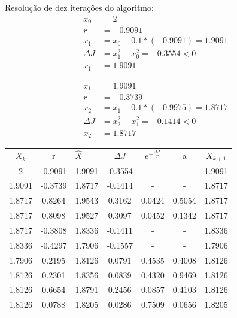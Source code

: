 \documentclass[12pt]{article}
\newenvironment{exercise}[2][Exercício]{\begin{trivlist}
\item[\hskip \labelsep {\bfseries #1}\hskip \labelsep {\bfseries #2.}]}{\end{trivlist}}
\begin{document}
\begin{exercise}{3.b}
Resolução de dez iterações do algoritmo:
\begin{align}
x_0 &= 2 \\
\nonumber r &= -0.9091 \\
\nonumber x_1 &= x_0 + 0.1*(-0.9091) = 1.9091 \\
\nonumber \Delta J &= x_1^2 - x_0^2 = -0.3554 < 0 \\ 
\nonumber x_1 &= 1.9091
\end{align}

\begin{align}
x_1 &= 1.9091 \\
\nonumber r &= -0.3739 \\
\nonumber x_2 &= x_1 + 0.1*(-0.9975) = 1.8717 \\
\nonumber \Delta J &= x_2^2 - x_1^2 = -0.1414 < 0 \\ 
\nonumber x_2 &= 1.8717
\end{align}

\begin{table}[H]
\centering
\label{t01}
\begin{tabular}{ccccccc}
$X_k$  & r       & \multicolumn{1}{l}{$\hat{X}$} & $\Delta J$ & $e^{-\frac{\Delta J}{T}}$ & a      & $X_{k+1}$ \\
2      & -0.9091 & 1.9091                        & -0.3554    & -                         & -      & 1.9091    \\
1.9091 & -0.3739 & 1.8717                        & -0.1414    & -                         & -      & 1.8717    \\
1.8717 & 0.8264  & 1.9543                        & 0.3162     & 0.0424                    & 0.5054 & 1.8717    \\
1.8717 & 0.8098  & 1.9527                        & 0.3097     & 0.0452                    & 0.1342 & 1.8717    \\
1.8717 & -0.3808 & 1.8336                        & -0.1411    & -                         & -      & 1.8336    \\
1.8336 & -0.4297 & 1.7906                        & -0.1557    & -                         & -      & 1.7906    \\
1.7906 & 0.2195  & 1.8126                        & 0.0791     & 0.4535                    & 0.4008 & 1.8126    \\
1.8126 & 0.2301  & 1.8356                        & 0.0839     & 0.4320                    & 0.9469 & 1.8126    \\
1.8126 & 0.6654  & 1.8791                        & 0.2456     & 0.0857                    & 0.4103 & 1.8126    \\
1.8126 & 0.0788  & 1.8205                        & 0.0286     & 0.7509                    & 0.0656 & 1.8205   
\end{tabular}
\end{table}

\end{exercise}
\end{document}
